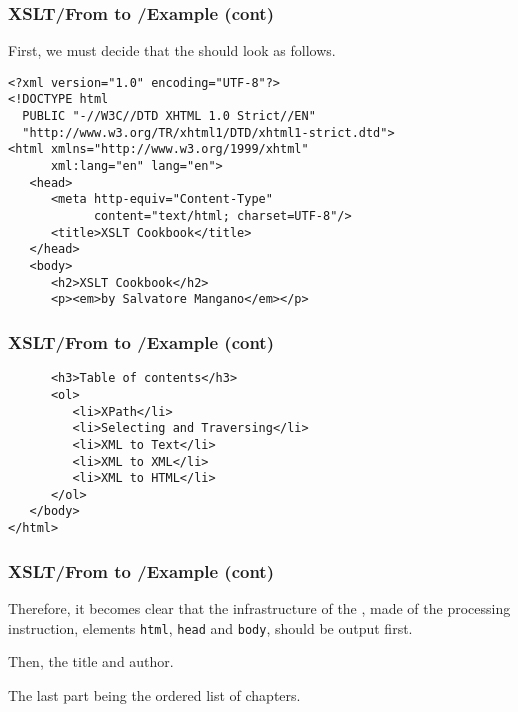 %
\begin{frame}[containsverbatim]
\frametitle{XSLT/From \XML to \XHTML{}/Example (cont)}

First, we must decide that the \XHTML should look as follows.
{\small
\begin{verbatim}
<?xml version="1.0" encoding="UTF-8"?>
<!DOCTYPE html
  PUBLIC "-//W3C//DTD XHTML 1.0 Strict//EN"
  "http://www.w3.org/TR/xhtml1/DTD/xhtml1-strict.dtd">
<html xmlns="http://www.w3.org/1999/xhtml"
      xml:lang="en" lang="en">
   <head>
      <meta http-equiv="Content-Type" 
            content="text/html; charset=UTF-8"/>
      <title>XSLT Cookbook</title>
   </head>
   <body>
      <h2>XSLT Cookbook</h2>
      <p><em>by Salvatore Mangano</em></p>
\end{verbatim}
}

\end{frame}

%
\begin{frame}[containsverbatim]
\frametitle{XSLT/From \XML to \XHTML{}/Example (cont)}

{\small
\begin{verbatim}
      <h3>Table of contents</h3>
      <ol>
         <li>XPath</li>
         <li>Selecting and Traversing</li>
         <li>XML to Text</li>
         <li>XML to XML</li>
         <li>XML to HTML</li>
      </ol>
   </body>
</html>
\end{verbatim}
}

\end{frame}

%
\begin{frame}
\frametitle{XSLT/From \XML to \XHTML{}/Example (cont)}

Therefore, it becomes clear that the infrastructure of the \XHTML,
made of the \XML processing instruction, \XHTML elements
\texttt{html}, \texttt{head} and \texttt{body}, should be output
first.

\bigskip

Then, the title and author.

\bigskip

The last part being the ordered list of chapters.

\end{frame}


